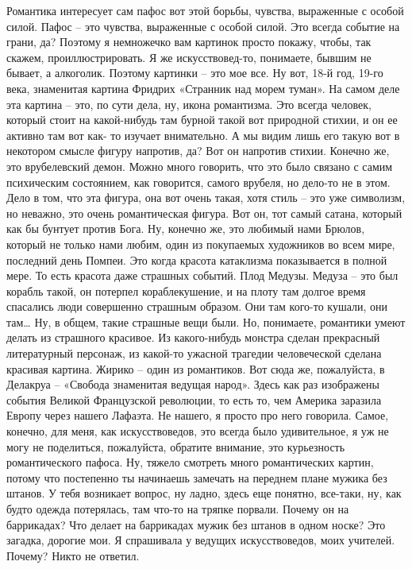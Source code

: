 Романтика интересует сам пафос вот этой борьбы, чувства, выраженные с особой
силой. Пафос – это чувства, выраженные с особой силой. Это всегда событие на
грани, да? Поэтому я немножечко вам картинок просто покажу, чтобы, так скажем,
проиллюстрировать. Я же искусствовед-то, понимаете, бывшим не бывает, а
алкоголик. Поэтому картинки – это мое все. Ну вот, 18-й год, 19-го века,
знаменитая картина Фридрих «Странник над морем туман». На самом деле эта картина
– это, по сути дела, ну, икона романтизма. Это всегда человек, который стоит на
какой-нибудь там бурной такой вот природной стихии, и он ее активно там вот как-
то изучает внимательно. А мы видим лишь его такую вот в некотором смысле фигуру
напротив, да? Вот он напротив стихии. Конечно же, это врубелевский демон. Можно
много говорить, что это было связано с самим психическим состоянием, как
говорится, самого врубеля, но дело-то не в этом. Дело в том, что эта фигура, она
вот очень такая, хотя стиль – это уже символизм, но неважно, это очень
романтическая фигура. Вот он, тот самый сатана, который как бы бунтует против
Бога. Ну, конечно же, это любимый нами Брюлов, который не только нами любим,
один из покупаемых художников во всем мире, последний день Помпеи. Это когда
красота катаклизма показывается в полной мере. То есть красота даже страшных
событий. Плод Медузы. Медуза – это был корабль такой, он потерпел
кораблекушение, и на плоту там долгое время спасались люди совершенно страшным
образом. Они там кого-то кушали, они там… Ну, в общем, такие страшные вещи были.
Но, понимаете, романтики умеют делать из страшного красивое. Из какого-нибудь
монстра сделан прекрасный литературный персонаж, из какой-то ужасной трагедии
человеческой сделана красивая картина. Жирико – один из романтиков. Вот сюда же,
пожалуйста, в Делакруа – «Свобода знаменитая ведущая народ». Здесь как раз
изображены события Великой Французской революции, то есть то, чем Америка
заразила Европу через нашего Лафаэта. Не нашего, я просто про него говорила.
Самое, конечно, для меня, как искусствоведов, это всегда было удивительное, я уж
не могу не поделиться, пожалуйста, обратите внимание, это курьезность
романтического пафоса. Ну, тяжело смотреть много романтических картин, потому
что постепенно ты начинаешь замечать на переднем плане мужика без штанов. У тебя
возникает вопрос, ну ладно, здесь еще понятно, все-таки, ну, как будто одежда
потерялась, там что-то на тряпке порвали. Почему он на баррикадах? Что делает на
баррикадах мужик без штанов в одном носке? Это загадка, дорогие мои. Я
спрашивала у ведущих искусствоведов, моих учителей. Почему? Никто не ответил.
